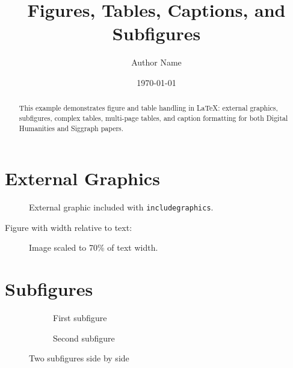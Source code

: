 \documentclass[12pt,a4paper]{article}
\title{Figures, Tables, Captions, and Subfigures}
\author{Author Name}
\date{\today}
\begin{document}
\maketitle

\begin{abstract}
This example demonstrates figure and table handling in \LaTeX{}:
external graphics, subfigures, complex tables, multi-page tables,
and caption formatting for both Digital Humanities and Siggraph papers.
\end{abstract}

\section{External Graphics}\label{sec:graphics}
\begin{figure}[htbp]
\centering
{}
\caption{External graphic included with \texttt{includegraphics}.}\label{fig:external}
\end{figure}

Figure with width relative to text:
\begin{figure}[htbp]
\centering
{}
\caption{Image scaled to 70\% of text width.}\label{fig:scaled}
\end{figure}

\section{Subfigures}\label{sec:subfigures}
\begin{figure}[htbp]
\centering
\begin{subfigure}[b]{0.45\textwidth}
\centering
\fbox{\parbox{5cm}{\centering [Subfigure A]}}
\caption{First subfigure}\label{subfig:a}
\end{subfigure}
\hfill
\begin{subfigure}[b]{0.45\textwidth}
\centering
\fbox{\parbox{5cm}{\centering [Subfigure B]}}
\caption{Second subfigure}\label{subfig:b}
\end{subfigure}
\caption{Two subfigures side by side}\label{fig:two-sub}
\end{figure}
\end{document}
